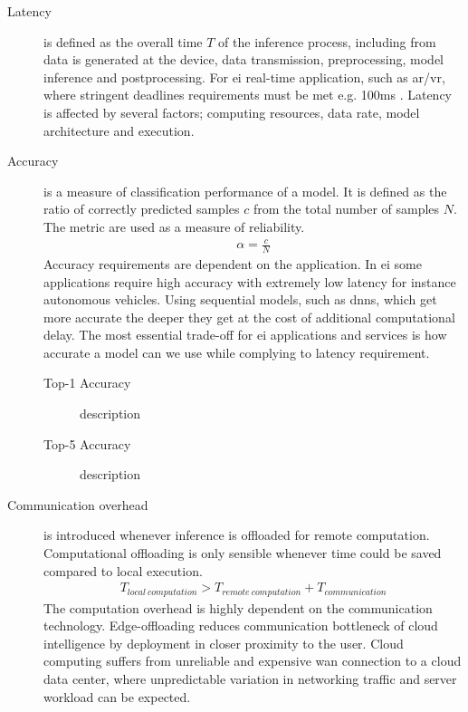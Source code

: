\begin{description}
	\item[Latency] is defined as the overall time $T$ of the inference process, including from data is generated at the device, data transmission, preprocessing, model inference and postprocessing. For \gls{ei} real-time application, such as \gls{ar}/\gls{vr}, where stringent deadlines requirements must be met e.g. 100ms \cite{bibid}. Latency is affected by several factors; computing resources, data rate, model architecture and execution.
	
	\item[Accuracy] is a measure of classification performance of a model. It is defined as the ratio of correctly predicted samples $c$ from the total number of samples $N$. The metric are used as a measure of reliability.
	\begin{align*}
	\alpha = \frac{c}{N}
	\end{align*}
	Accuracy requirements are dependent on the application. In \gls{ei} some applications require high accuracy with extremely low latency for instance autonomous vehicles. Using sequential models, such as \gls{dnn}s, which get more accurate the deeper they get at the cost of additional computational delay. The most essential trade-off for \gls{ei} applications and services is how accurate a model can we use while complying to latency requirement.
	
	\begin{description}
		\item[Top-1 Accuracy] description
		\item[Top-5 Accuracy] description
	\end{description}
	
	
	\item[Communication overhead] is introduced whenever inference is offloaded for remote computation. Computational offloading is only sensible whenever time could be saved compared to local execution.
	\begin{align*}
	T_{local\: computation} > T_{remote\: computation} + T_{communication}
	\end{align*}
	The computation overhead is highly dependent on the communication technology. Edge-offloading reduces communication bottleneck of cloud intelligence by deployment in closer proximity to the user. Cloud computing suffers from unreliable and expensive \gls{wan} connection to a cloud data center, where unpredictable variation in networking traffic and server workload can be expected. 
	

\end{description}
